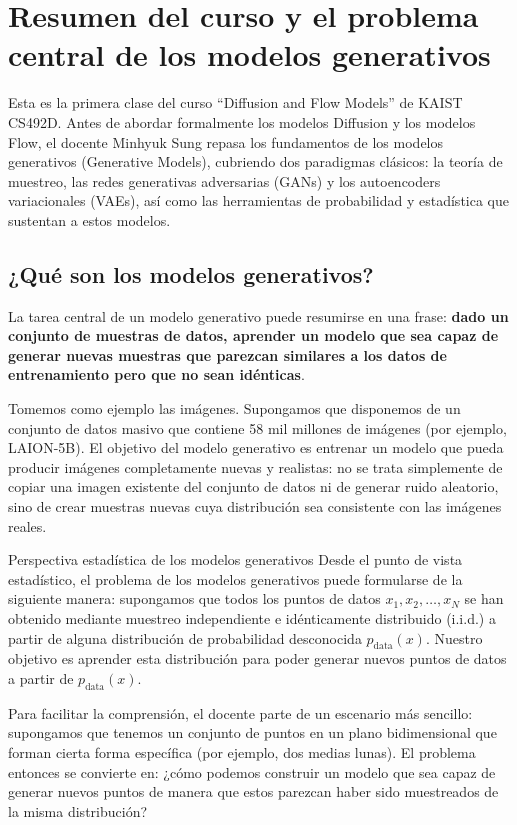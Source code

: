 \section{Resumen del curso y el problema central de los modelos generativos}

Esta es la primera clase del curso ``Diffusion and Flow Models'' de KAIST CS492D. Antes de abordar formalmente los modelos Diffusion y los modelos Flow, el docente Minhyuk Sung repasa los fundamentos de los modelos generativos (Generative Models), cubriendo dos paradigmas clásicos: la teoría de muestreo, las redes generativas adversarias (GANs) y los autoencoders variacionales (VAEs), así como las herramientas de probabilidad y estadística que sustentan a estos modelos.

\subsection{¿Qué son los modelos generativos?}

La tarea central de un modelo generativo puede resumirse en una frase: \textbf{dado un conjunto de muestras de datos, aprender un modelo que sea capaz de generar nuevas muestras que parezcan similares a los datos de entrenamiento pero que no sean idénticas}.

Tomemos como ejemplo las imágenes. Supongamos que disponemos de un conjunto de datos masivo que contiene 58 mil millones de imágenes (por ejemplo, LAION-5B). El objetivo del modelo generativo es entrenar un modelo que pueda producir imágenes completamente nuevas y realistas: no se trata simplemente de copiar una imagen existente del conjunto de datos ni de generar ruido aleatorio, sino de crear muestras nuevas cuya distribución sea consistente con las imágenes reales.

\begin{importantbox}{Perspectiva estadística de los modelos generativos}
Desde el punto de vista estadístico, el problema de los modelos generativos puede formularse de la siguiente manera: supongamos que todos los puntos de datos $x_1, x_2, \ldots, x_N$ se han obtenido mediante muestreo independiente e idénticamente distribuido (i.i.d.) a partir de alguna distribución de probabilidad desconocida $p_{\text{data}}(x)$. Nuestro objetivo es aprender esta distribución para poder generar nuevos puntos de datos a partir de $p_{\text{data}}(x)$.
\end{importantbox}

Para facilitar la comprensión, el docente parte de un escenario más sencillo: supongamos que tenemos un conjunto de puntos en un plano bidimensional que forman cierta forma específica (por ejemplo, dos medias lunas). El problema entonces se convierte en: ¿cómo podemos construir un modelo que sea capaz de generar nuevos puntos de manera que estos parezcan haber sido muestreados de la misma distribución?

